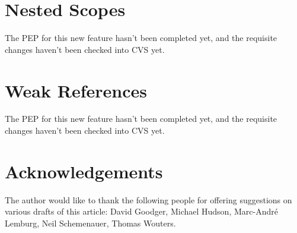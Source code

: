 \documentclass{howto}
\begin{document}
\section{Nested Scopes}

The PEP for this new feature hasn't been completed yet, and the
requisite changes haven't been checked into CVS yet.

\begin{seealso}


\end{seealso}


\section{Weak References}

The PEP for this new feature hasn't been completed yet, and the
requisite changes haven't been checked into CVS yet.


\begin{seealso}


\end{seealso}


\section{Acknowledgements}

The author would like to thank the following people for offering
suggestions on various drafts of this article: David Goodger, Michael
Hudson, Marc-Andr\'e Lemburg, Neil Schemenauer, Thomas Wouters.
\end{document}
